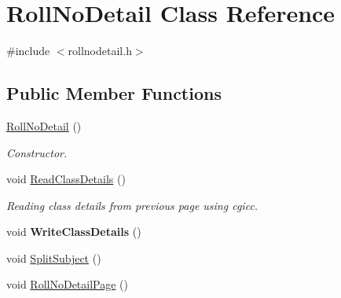 \hypertarget{classRollNoDetail}{\section{Roll\-No\-Detail Class Reference}
\label{classRollNoDetail}
}


{\ttfamily \#include $<$rollnodetail.\-h$>$}

\subsection*{Public Member Functions}
\begin{DoxyCompactItemize}
\item 
\hyperlink{classRollNoDetail_a35022484630c725f33e0d9f70ee678d7}{Roll\-No\-Detail} ()
\begin{DoxyCompactList}\small\item\em Constructor. \end{DoxyCompactList}\item 
void \hyperlink{classRollNoDetail_a941f09a9307b97c7d3655e68815954c3}{Read\-Class\-Details} ()
\begin{DoxyCompactList}\small\item\em Reading class details from previous page using cgicc. \end{DoxyCompactList}\item 
\hypertarget{classRollNoDetail_adeb8b51063f8e325c36472b8ab98557a}{void {\bfseries Write\-Class\-Details} ()}\label{classRollNoDetail_adeb8b51063f8e325c36472b8ab98557a}

\item 
void \hyperlink{classRollNoDetail_ad4be41f8530ff63875abf393ba418cf8}{Split\-Subject} ()
\item 
void \hyperlink{classRollNoDetail_a04a2acda591876589e1a4852aef8e9ef}{Roll\-No\-Detail\-Page} ()
\end{DoxyCompactItemize}
